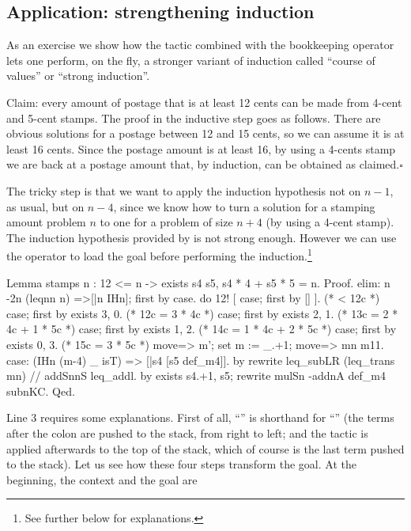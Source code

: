 \subsection{Application: strengthening induction}
\label{sec:strongind}

As an exercise we show how the  tactic combined with the bookkeeping
operator \C{:} lets one perform, on the fly, a stronger variant of
induction called ``course of values'' or ``strong induction''.

Claim: every amount of postage that is at least 12 cents
can be made from 4-cent and 5-cent stamps.  The proof in the inductive
step goes as follows.  There are obvious solutions for a postage between
12 and 15 cents, so we can assume it is at least 16 cents.  Since
the postage amount is at least 16, by using a 4-cents stamp we are back
at a postage amount that, by induction, can be obtained as claimed.\hfill$\square$

The tricky step is that we want to apply the induction hypothesis not
on $n-1$, as usual, but on $n-4$, since we know how to turn a
solution for a stamping amount problem $n$ to one for a problem of
size $n+4$ (by using a 4-cent stamp).
The induction hypothesis provided by 
is not strong enough.  However we can use the \C{:} operator
to load the goal before performing the induction.\footnote{See further
below for explanations.}

\begin{coq}{}{}
Lemma stamps n : 12 <= n -> exists s4 s5, s4 * 4 + s5 * 5 = n.
Proof.
elim: n {-2}n (leqnn n) =>[|n IHn]; first by case.
do 12! [ case; first by [] ]. (* < 12c *)
case; first by exists 3, 0.   (* 12c = 3 * 4c *)
case; first by exists 2, 1.   (* 13c = 2 * 4c + 1 * 5c *)
case; first by exists 1, 2.   (* 14c = 1 * 4c + 2 * 5c *)
case; first by exists 0, 3.   (* 15c = 3 * 5c *)
move=> m'; set m := _.+1; move=> mn m11.
case: (IHn (m-4) _ isT) => [|s4 [s5 def_m4]].
  by rewrite leq_subLR (leq_trans mn) // addSnnS leq_addl.
by exists s4.+1, s5; rewrite mulSn -addnA def_m4 subnKC.
Qed.
\end{coq}

Line 3 requires some explanations. First of all,
``'' is shorthand for
``'' (the terms after the
colon \C{:} are pushed to the stack, from right to left; and the
 tactic is applied afterwards to the top of the stack, which
of course is the last term pushed to the stack). Let us see how these
four steps transform the goal. At the beginning, the context and the
goal are

